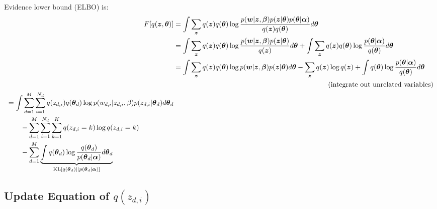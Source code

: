 \documentclass[a4paper,10.5pt,dvipdfmx]{jarticle}  %
\begin{document}
Evidence lower bound (ELBO) is:
\begin{align}
	F[q(\boldsymbol{z}, \boldsymbol{\theta})] &= \int \sum_{\boldsymbol{z}} q(\boldsymbol{z}) q(\boldsymbol{\theta}) \log \frac{p(\boldsymbol{w} | \boldsymbol{z}, \boldsymbol{\beta}) p(\boldsymbol{z} | \boldsymbol{\theta}) p(\boldsymbol{\theta} | \boldsymbol{\alpha})}{q(\boldsymbol{z}) q(\boldsymbol{\theta})} d \boldsymbol{\theta}\\
&= \int \sum_{\boldsymbol{z}} q(\boldsymbol{z}) q(\boldsymbol{\theta}) \log \frac{p(\boldsymbol{w} | \boldsymbol{z}, \boldsymbol{\beta}) p(\boldsymbol{z} | \boldsymbol{\theta})}{q(\boldsymbol{z})} d \boldsymbol{\theta} + \int \sum_{\boldsymbol{z}} q(\boldsymbol{z}) q(\boldsymbol{\theta}) \log \frac{p(\boldsymbol{\theta} | \boldsymbol{\alpha})}{q(\boldsymbol{\theta})} d \boldsymbol{\theta} \\
&=\int \sum_{\boldsymbol{z}} q(\boldsymbol{z}) q(\boldsymbol{\theta}) \log p(\boldsymbol{w} | \boldsymbol{z}, \boldsymbol{\beta}) p(\boldsymbol{z} | \boldsymbol{\theta}) d \boldsymbol{\theta} - \sum_{\boldsymbol{z}} q(\boldsymbol{z}) \log q (\boldsymbol{z}) + \int q(\boldsymbol{\theta}) \log \frac{p(\boldsymbol{\theta} | \boldsymbol{\alpha})}{q(\boldsymbol{\theta})} d \boldsymbol{\theta} \\
&\qquad\qquad\qquad\qquad\qquad\qquad\qquad\qquad\qquad\qquad\qquad ({\rm integrate\ out\ unrelated\ variables}) \nonumber \\
\begin{split}
&= \int \sum_{d=1}^{M} \sum_{i=1}^{N_d} q(z_{d,i}) q(\boldsymbol{\theta}_d) \log p(w_{d,i} | z_{d,i}, \beta) p(z_{d,i} | \boldsymbol{\theta}_d) d \boldsymbol{\theta}_d\\
&\qquad - \sum_{d=1}^{M} \sum_{i=1}^{N_d} \sum_{k=1}^{K} q(z_{d,i} = k) \log q(z_{d,i} = k)\\
&\qquad - \sum_{d=1}^{M} \underbrace{\int q(\boldsymbol{\theta}_d) \log \frac{q(\boldsymbol{\theta}_d)}{p(\boldsymbol{\theta}_d | \boldsymbol{\alpha})} d \boldsymbol{\theta}_d}_{{\rm KL}\left[ q(\boldsymbol{\theta}_d) || p(\boldsymbol{\theta}_d | \boldsymbol{\alpha}) \right]}
\end{split} \label{Eq:ELBO}
\end{align}

\subsection{Update Equation of $q(z_{d,i})$}
\end{document}
